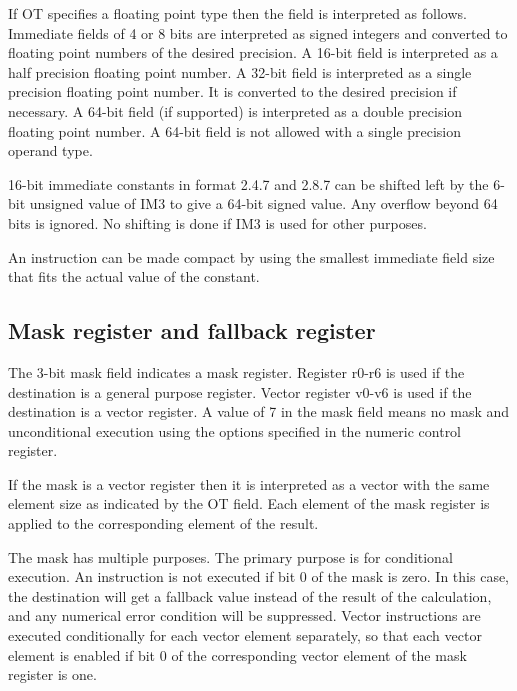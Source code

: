 \documentclass[forwardcom.tex]{subfiles}
\begin{document}
If OT specifies a floating point type then the field is interpreted as follows. Immediate fields of 4 or 8 bits are interpreted as signed integers and converted to floating point numbers of the desired precision. A 16-bit field is interpreted as a half precision floating point number. A 32-bit field is interpreted as a single precision floating point number. It is converted to the desired precision if necessary. A 64-bit field (if supported) is interpreted as a double precision floating point number. A 64-bit field is not allowed with a single precision operand type.
\vspace{2mm}

16-bit immediate constants in format 2.4.7 and 2.8.7 can be shifted left by the 6-bit unsigned value of IM3 to give a 64-bit signed value. Any overflow beyond 64 bits is ignored. No shifting is done if IM3 is used for other purposes.
\vspace{2mm}

An instruction can be made compact by using the smallest immediate field size that fits the actual value of the constant.

\subsection{Mask register and fallback register}
The 3-bit mask field indicates a mask register. Register r0-r6 is used if the destination is a general purpose register. Vector register v0-v6 is used if the destination is a vector register. A value of 7 in the mask field means no mask and unconditional execution using the options specified in the numeric control register.
\vspace{2mm}

If the mask is a vector register then it is interpreted as a vector with the same element size as indicated by the OT field. Each element of the mask register is applied to the corresponding element of the result.
\vspace{2mm}

The mask has multiple purposes. The primary purpose is for conditional execution. An instruction is not executed if bit 0 of the mask is zero. In this case, the destination will get a fallback value instead of the result of the calculation, and any numerical error condition will be suppressed. Vector instructions are executed conditionally for each vector element separately, so that each vector element is enabled if bit 0 of the corresponding vector element of the mask register is one.
\vspace{2mm}
\end{document}
